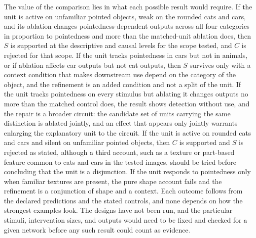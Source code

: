 \documentclass[11pt]{article}
\begin{document}
The value of the comparison lies in what each possible result would require. If the unit is active on unfamiliar pointed objects, weak on the rounded cats and cars, and its ablation changes pointedness-dependent outputs across all four categories in proportion to pointedness and more than the matched-unit ablation does, then $S$ is supported at the descriptive and causal levels for the scope tested, and $C$ is rejected for that scope. If the unit tracks pointedness in cars but not in animals, or if ablation affects car outputs but not cat outputs, then $S$ survives only with a context condition that makes downstream use depend on the category of the object, and the refinement is an added condition and not a split of the unit. If the unit tracks pointedness on every stimulus but ablating it changes outputs no more than the matched control does, the result shows detection without use, and the repair is a broader circuit: the candidate set of units carrying the same distinction is ablated jointly, and an effect that appears only jointly warrants enlarging the explanatory unit to the circuit. If the unit is active on rounded cats and cars and silent on unfamiliar pointed objects, then $C$ is supported and $S$ is rejected as stated, although a third account, such as a texture or part-based feature common to cats and cars in the tested images, should be tried before concluding that the unit is a disjunction. If the unit responds to pointedness only when familiar textures are present, the pure shape account fails and the refinement is a conjunction of shape and a context. Each outcome follows from the declared predictions and the stated controls, and none depends on how the strongest examples look. The designs have not been run, and the particular stimuli, intervention sizes, and outputs would need to be fixed and checked for a given network before any such result could count as evidence.
\end{document}
